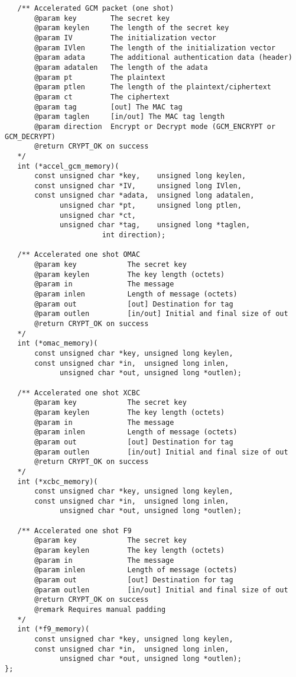 \documentclass[synpaper]{book}
\begin{document}
\begin{small}
\begin{verbatim}
   /** Accelerated GCM packet (one shot)
       @param key        The secret key
       @param keylen     The length of the secret key
       @param IV         The initialization vector
       @param IVlen      The length of the initialization vector
       @param adata      The additional authentication data (header)
       @param adatalen   The length of the adata
       @param pt         The plaintext
       @param ptlen      The length of the plaintext/ciphertext
       @param ct         The ciphertext
       @param tag        [out] The MAC tag
       @param taglen     [in/out] The MAC tag length
       @param direction  Encrypt or Decrypt mode (GCM_ENCRYPT or GCM_DECRYPT)
       @return CRYPT_OK on success
   */
   int (*accel_gcm_memory)(
       const unsigned char *key,    unsigned long keylen,
       const unsigned char *IV,     unsigned long IVlen,
       const unsigned char *adata,  unsigned long adatalen,
             unsigned char *pt,     unsigned long ptlen,
             unsigned char *ct,
             unsigned char *tag,    unsigned long *taglen,
                       int direction);

   /** Accelerated one shot OMAC
       @param key            The secret key
       @param keylen         The key length (octets)
       @param in             The message
       @param inlen          Length of message (octets)
       @param out            [out] Destination for tag
       @param outlen         [in/out] Initial and final size of out
       @return CRYPT_OK on success
   */
   int (*omac_memory)(
       const unsigned char *key, unsigned long keylen,
       const unsigned char *in,  unsigned long inlen,
             unsigned char *out, unsigned long *outlen);

   /** Accelerated one shot XCBC
       @param key            The secret key
       @param keylen         The key length (octets)
       @param in             The message
       @param inlen          Length of message (octets)
       @param out            [out] Destination for tag
       @param outlen         [in/out] Initial and final size of out
       @return CRYPT_OK on success
   */
   int (*xcbc_memory)(
       const unsigned char *key, unsigned long keylen,
       const unsigned char *in,  unsigned long inlen,
             unsigned char *out, unsigned long *outlen);

   /** Accelerated one shot F9
       @param key            The secret key
       @param keylen         The key length (octets)
       @param in             The message
       @param inlen          Length of message (octets)
       @param out            [out] Destination for tag
       @param outlen         [in/out] Initial and final size of out
       @return CRYPT_OK on success
       @remark Requires manual padding
   */
   int (*f9_memory)(
       const unsigned char *key, unsigned long keylen,
       const unsigned char *in,  unsigned long inlen,
             unsigned char *out, unsigned long *outlen);
};
\end{verbatim}
\end{small}
\end{document}
